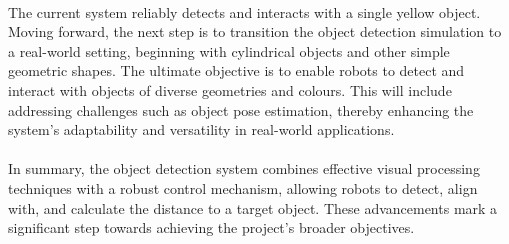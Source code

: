 \paragraph*{}
The current system reliably detects and interacts with a single yellow object. Moving forward, the next step is to transition the object detection simulation to a real-world setting, beginning with cylindrical objects and other simple geometric shapes. The ultimate objective is to enable robots to detect and interact with objects of diverse geometries and colours. This will include addressing challenges such as object pose estimation, thereby enhancing the system's adaptability and versatility in real-world applications.

\paragraph*{}
In summary, the object detection system combines effective visual processing techniques with a robust control mechanism, allowing robots to detect, align with, and calculate the distance to a target object. These advancements mark a significant step towards achieving the project's broader objectives.
